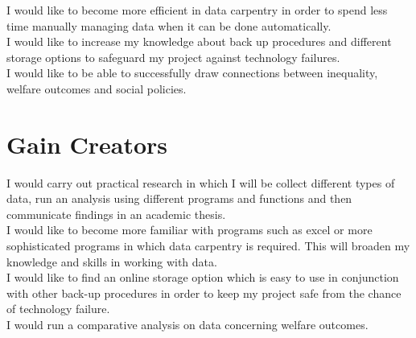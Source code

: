 \documentclass{article}
\begin{document}
I would like to become more efficient in data carpentry in order to spend less time manually managing data when it can be done automatically.\\

I would like to increase my knowledge about back up procedures and different storage options to safeguard my project against technology failures. \\

I would like to be able to successfully draw connections between inequality, welfare outcomes and social policies. 

\section{Gain Creators}
I would carry out practical research in which I will be collect different types of data, run an analysis using different programs and functions and then communicate findings in an academic thesis. \\

I would like to become more familiar with programs such as excel or more sophisticated programs in which data carpentry is required. This will broaden my knowledge and skills in working with data. \\

I would like to find an online storage option which is easy to use in conjunction with other back-up procedures in order to keep my project safe from the chance of technology failure. \\

I would run a comparative analysis on data concerning welfare outcomes. 
\end{document}
